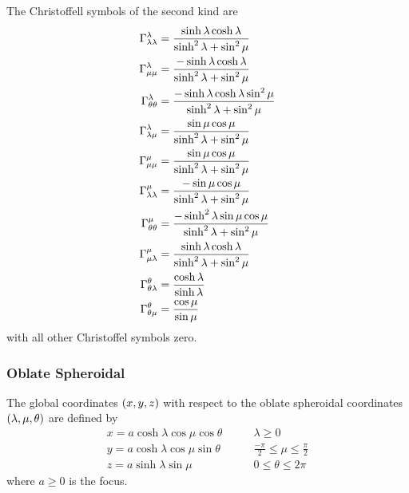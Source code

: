 The Christoffell symbols of the second kind are
\begin{align}
   \Gamma^{\lambda}_{\lambda\lambda} &=\frac{\sinh\lambda\cosh\lambda}{\sinh^{2}\lambda+\sin^{2}\mu} \\
   \Gamma^{\lambda}_{\mu\mu} &=\frac{-\sinh\lambda\cosh\lambda}{\sinh^{2}\lambda+\sin^{2}\mu} \\
   \Gamma^{\lambda}_{\theta\theta} &=\frac{-\sinh\lambda\cosh\lambda\sin^{2}\mu}{\sinh^{2}\lambda+\sin^{2}\mu} \\
   \Gamma^{\lambda}_{\lambda\mu} &=\frac{\sin\mu\cos\mu}{\sinh^{2}\lambda+\sin^{2}\mu} \\
   \Gamma^{\mu}_{\mu\mu} &=\frac{\sin\mu\cos\mu}{\sinh^{2}\lambda+\sin^{2}\mu} \\
   \Gamma^{\mu}_{\lambda\lambda} &=\frac{-\sin\mu\cos\mu}{\sinh^{2}\lambda+\sin^{2}\mu} \\
   \Gamma^{\mu}_{\theta\theta} &=\frac{-\sinh^{2}\lambda\sin\mu\cos\mu}{\sinh^{2}\lambda+\sin^{2}\mu} \\
   \Gamma^{\mu}_{\mu\lambda} &=\frac{\sinh\lambda\cosh\lambda}{\sinh^{2}\lambda+\sin^{2}\mu} \\
   \Gamma^{\theta}_{\theta\lambda} &=\frac{\cosh\lambda}{\sinh\lambda} \\
   \Gamma^{\theta}_{\theta\mu} &=\frac{\cos\mu}{\sin\mu} \\
 \end{align}
with all other Christoffel symbols zero.

\subsubsection{Oblate Spheroidal}

The global coordinates $\left( x,y,z \right)$ with respect to the oblate spheroidal
coordinates $\left( \lambda,\mu,\theta \right)$  are defined by
\begin{equation}
  \begin{aligned}
    x = a\cosh\lambda\cos\mu\cos\theta & \qquad \lambda \ge 0 \\
    y = a\cosh\lambda\cos\mu\sin\theta & \qquad \frac{-\pi}{2} \le \mu \le \frac{\pi}{2} \\
    z = a\sinh\lambda\sin\mu & \qquad 0 \le \theta \le 2\pi 
  \end{aligned}
\end{equation}
where $a\ge0$ is the focus.

